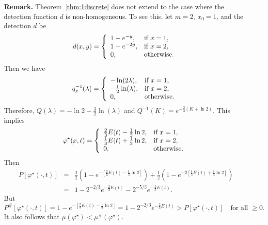 \documentclass[12pt]{article}
\theoremstyle{plain}
\theoremstyle{definition}
\theoremstyle{remark}
\begin{document}
\noindent \textbf{Remark.} Theorem~\ref{thm:1discrete} does not extend to the case where the detection function $d$ is non-homogeneous. To see this, let $m=2$, $x_0=1$, and the detection $d$ be 
\[
d(x, y)=\left\{
		                           \begin{array}{ll}
		                           1-e^{-y},& \hbox{if $x=1$,} \\
					1-e^{-2y},  & \hbox{if $x=2$,}\\
					0, & \hbox{otherwise.}
		                          \end{array}
		                         \right.\\
\]
Then we have 
\[
q_x^{-1}(\lambda)=\left\{
		                           \begin{array}{ll}
		                           -\ln (2\lambda),& \hbox{if $x=1$,} \\
					-\frac{1}{2}\ln (\lambda),  & \hbox{if $x=2$,}\\
					0, & \hbox{otherwise.}
		                          \end{array}
		                         \right.\\
\]
Therefore,  $Q(\lambda)=-\ln 2 -\frac{3}{2}\ln(\lambda)$ and $Q^{-1}(K)=e^{-\frac{2}{3}(K +\ln 2)}$.  This implies
\[
\varphi^{\star}(x, t)=\left\{
		                           \begin{array}{ll}
		                           \frac{2}{3}E(t)-\frac{1}{3}\ln 2,& \hbox{if $x=1$,} \\
					 \frac{1}{3}E(t)+\frac{1}{3}\ln 2,  & \hbox{if $x=2$,}\\
					0, & \hbox{otherwise.}
		                          \end{array}
		                         \right.\\
\]
Then 
\begin{eqnarray*}
P[\varphi^\star(\cdot, t)] &=& \frac{1}{2}\left(1-e^{-\left[\frac{2}{3}E(t)-\frac{1}{3}\ln 2\right]}\right)+\frac{1}{2}\left(1-e^{-2\left[\frac{1}{3}E(t)+\frac{1}{3}\ln 2\right]}\right) \\
&=& 1-2^{-2/3} e^{-\frac{2}{3}E(t)}-2^{-5/3} e^{-\frac{2}{3}E(t)}.
\end{eqnarray*}
But 
\[
P^{\#}[\varphi^\star(\cdot, t)]=1-e^{-\left[\frac{2}{3}E(t)-\frac{1}{3} \ln 2\right]}=1-2^{-2/3}e^{-\frac{2}{3}E(t)}>P[\varphi^\star(\cdot, t)]
\quad \text{for all $\geq 0$}. 
\]
It also follows that $\mu(\varphi^\star)< \mu^{\#}(\varphi^\star)$.
\end{document}
